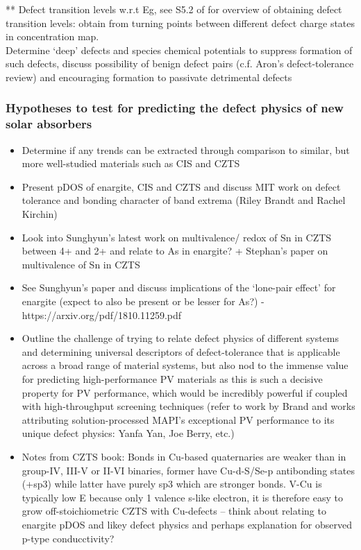 \documentclass[11pt, twoside]{report}
\begin{document}
** Defect transition levels w.r.t Eg, see S5.2 of \cite{defects_Chen_large} for overview of obtaining defect transition levels: obtain from turning points between different defect charge states in concentration map.\\

Determine `deep' defects and species chemical potentials to suppress formation of such defects, discuss possibility of benign defect pairs (c.f. Aron's defect-tolerance review) and encouraging formation to passivate detrimental defects

\subsubsection{Hypotheses to test for predicting the defect physics of new solar absorbers}

\begin{itemize}
\item Determine if any trends can be extracted through comparison to similar, but more well-studied materials such as CIS and CZTS
\item Present pDOS of enargite, CIS and CZTS and discuss MIT work on defect tolerance and bonding character of band extrema (Riley Brandt and Rachel Kirchin)
\item Look into Sunghyun's latest work on multivalence/ redox of Sn in CZTS between 4+ and 2+ and relate to As in enargite? + Stephan's paper on multivalence of Sn in CZTS
\item See Sunghyun's paper and discuss implications of the `lone-pair effect' for enargite (expect to also be present or be lesser for As?) - https://arxiv.org/pdf/1810.11259.pdf
\item Outline the challenge of trying to relate defect physics of different systems and determining universal descriptors of defect-tolerance that is applicable across a broad range of material systems, but also nod to the immense value for predicting high-performance PV materials as this is such a decisive property for PV performance, which would be incredibly powerful if coupled with high-throughput screening techniques (refer to work by Brand and works attributing solution-processed MAPI's exceptional PV performance to its unique defect physics: Yanfa Yan, Joe Berry, etc.)
\item Notes from CZTS book: Bonds in Cu-based quaternaries are weaker than in group-IV, III-V or II-VI binaries, former have Cu-d-S/Se-p antibonding states (+sp3) while latter have purely sp3 which are stronger bonds. V-Cu is typically low E because only 1 valence s-like electron, it is therefore easy to grow off-stoichiometric CZTS with Cu-defects -- think about relating to enargite pDOS and likey defect physics and perhaps explanation for observed p-type conducctivity?
\end{itemize}
\end{document}
